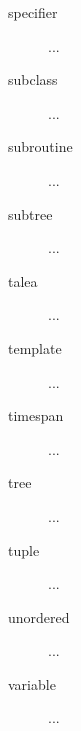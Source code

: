 \begin{description}
\item[specifier] ...

\item[subclass] ...

\item[subroutine] ...

\item[subtree] ...

\item[talea] ...

\item[template] ...

\item[timespan] ...

\item[tree] ...

\item[tuple] ...

\item[unordered] ...

\item[variable] ...

\end{description}